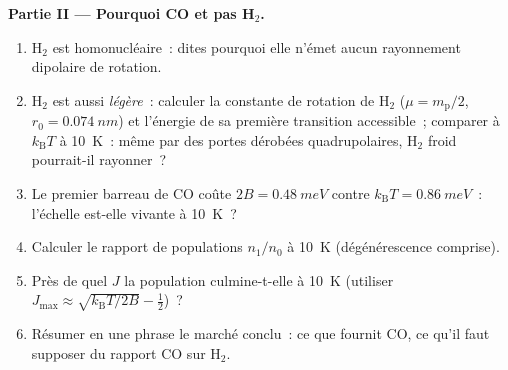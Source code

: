 \begin{problem}
\medskip\noindent\textbf{Partie II --- Pourquoi CO et pas H$_2$.}
\begin{enumerate}[resume]
  \item H$_2$ est homonucléaire~: dites pourquoi elle n'émet aucun
        rayonnement dipolaire de rotation.
  \item H$_2$ est aussi \emph{légère}~: calculer la constante de
        rotation de H$_2$ ($\mu = m_{\text{p}}/2$,
        $r_0 = \qty{0.074}{nm}$) et l'énergie de sa première
        transition accessible~; comparer à $k_{\text{B}}T$ à
        \qty{10}{K}~: même par des portes dérobées quadrupolaires,
        H$_2$ froid pourrait-il rayonner~?
  \item Le premier barreau de CO coûte $2B = \qty{0.48}{meV}$ contre
        $k_{\text{B}}T = \qty{0.86}{meV}$~: l'échelle est-elle vivante
        à \qty{10}{K}~?
  \item Calculer le rapport de populations $n_1/n_0$ à \qty{10}{K}
        (dégénérescence comprise).
  \item Près de quel $J$ la population culmine-t-elle à \qty{10}{K}
        (utiliser $J_{\max} \approx \sqrt{k_{\text{B}}T/2B} - \tfrac12$)~?
  \item Résumer en une phrase le marché conclu~: ce que fournit CO,
        ce qu'il faut supposer du rapport CO sur H$_2$.
\end{enumerate}


\end{problem}
